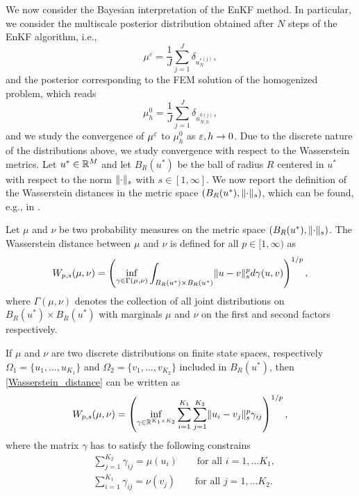 We now consider the Bayesian interpretation of the EnKF method. In particular, we consider the multiscale posterior distribution obtained after $N$ steps of the EnKF algorithm, i.e.,
\[ \mu^{\varepsilon} = \frac{1}{J} \sum_{j=1}^J \delta_{u_N^{\varepsilon(j)}}, \]
and the posterior corresponding to the FEM solution of the homogenized problem, which reads
\[ \mu^0_h = \frac{1}{J} \sum_{j=1}^J \delta_{u_{N,h}^{0(j)}}, \]
and we study the convergence of $\mu^\varepsilon$ to $\mu_h^0$ as $\varepsilon, h \to 0$. Due to the discrete nature of the distributions above, we study convergence with respect to the Wasserstein metrics. Let $u^* \in \mathbb{R}^M$ and let $B_R(u^*)$ be the ball of radius $R$ centered in $u^*$ with respect to the norm $\lVert\cdot\rVert_s$ with $s \in [1,\infty]$. We now report the definition of the Wasserstein distances in the metric space $(B_R(u^*), \lVert\cdot\rVert_s)$, which can be found, e.g., in \cite{San15}.

\begin{definition}
\label{Wasserstein_definition}
Let $\mu$ and $\nu$ be two probability measures on the metric space $(B_R(u^*), \lVert\cdot\rVert_s)$. The Wasserstein distance between $\mu$ and $\nu$ is defined for all $p \in [1, \infty)$ as
\begin{equation}
\label{Wasserstein_distance}
W_{p,s}(\mu, \nu) = \left ( \inf_{\gamma \in \Gamma(\mu, \nu)} \int_{B_R(u^*) \times B_R(u^*)} \lVert u - v\rVert_s^p d \gamma(u,v) \right )^{1/p},
\end{equation}
where $\Gamma(\mu, \nu)$ denotes the collection of all joint distributions on $B_R(u^*) \times B_R(u^*)$ with marginals $\mu$ and $\nu$ on the first and second factors respectively.
\end{definition}

\begin{remark}
If $\mu$ and $\nu$ are two discrete distributions on finite state spaces, respectively $\Omega_1 = \{ u_1, \dots, u_{K_1} \}$ and $\Omega_2 = \{ v_1, \dots, v_{K_2} \}$ included in $B_R(u^*)$, then \eqref{Wasserstein_distance} can be written as
\begin{equation}
\label{Wasserstein_distance_discrete}
W_{p,s}(\mu, \nu) = \left ( \inf_{\gamma \in \mathbb{R}^{K_1 \times K_2}} \sum_{i=1}^{K_1} \sum_{j=1}^{K_2} \lVert u_i - v_j\rVert_s^p \gamma_{ij} \right )^{1/p},
\end{equation}
where the matrix $\gamma$ has to satisfy the following constrains
\begin{align*}
& \sum_{j=1}^{K_2} \gamma_{ij} = \mu(u_i) \qquad \text{for all } i = 1, \dots K_1, \\
& \sum_{i=1}^{K_1} \gamma_{ij} = \nu(v_j) \qquad \text{for all } j = 1, \dots K_2.
\end{align*}
\end{remark}

